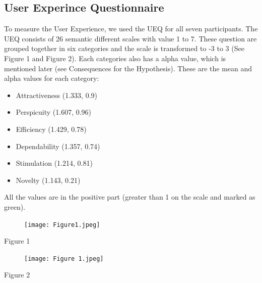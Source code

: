 \documentclass{sigchi}
\begin{document}
\subsection{User Experince Questionnaire}
To measure the User Experience, we used the UEQ for all seven participants. The UEQ consists of 26 semantic different scales with value 1 to 7. These question are grouped together in six categories and the scale is transformed to -3 to 3 (See Figure 1 and Figure 2).
Each categories also has a alpha value, which is mentioned later (see Consequences for the Hypothesis).
These are the mean and alpha values for each category:
\begin{itemize}
\item Attractiveness (1.333, 0.9)
\item Perspicuity (1.607, 0.96)
\item Efficiency (1.429, 0.78)
\item Dependability (1.357, 0.74)
\item Stimulation (1.214, 0.81)
\item Novelty (1.143, 0.21)
\end{itemize}
All the values are in the positive part (greater than 1 on the scale and marked as green).

\begin{figure}[h]
		\centering
			\texttt{[image: Figure1.jpeg]}
		\end{figure}
Figure 1
    
 \begin{figure}[h]
		\centering
			\texttt{[image: Figure 1.jpeg]}
\end{figure}
Figure 2
\end{document}
